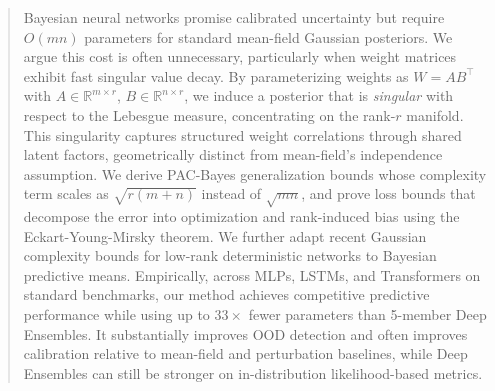 \documentclass{article}
\theoremstyle{plain}
\theoremstyle{definition}
\theoremstyle{remark}
\begin{document}


\printAffiliationsAndNotice{}  %

\begin{abstract}
Bayesian neural networks promise calibrated uncertainty but require $O(mn)$ parameters for standard mean-field Gaussian posteriors. We argue this cost is often unnecessary, particularly when weight matrices exhibit fast singular value decay.
By parameterizing weights as $W = AB^{\top}$ with $A \in \mathbb{R}^{m \times r}$, 
$B \in \mathbb{R}^{n \times r}$, we induce a posterior that is \emph{singular} 
with respect to the Lebesgue measure, concentrating on the rank-$r$ manifold. This 
singularity captures structured weight correlations through shared latent 
factors, geometrically distinct from mean-field's independence assumption. We derive PAC-Bayes generalization bounds whose complexity term scales as $\sqrt{r(m+n)}$ instead of $\sqrt{m n}$, and prove loss bounds that decompose the error into optimization and rank-induced bias using the Eckart-Young-Mirsky theorem. We further adapt recent Gaussian complexity bounds for low-rank deterministic networks to Bayesian predictive means. 
Empirically, across MLPs, LSTMs, and Transformers on standard benchmarks, our method achieves competitive predictive performance while using up to $33\times$ fewer parameters than 5-member Deep Ensembles. It substantially improves OOD detection and often improves calibration relative to mean-field and perturbation baselines, while Deep Ensembles can still be stronger on in-distribution likelihood-based metrics.

\end{abstract}
\end{document}

